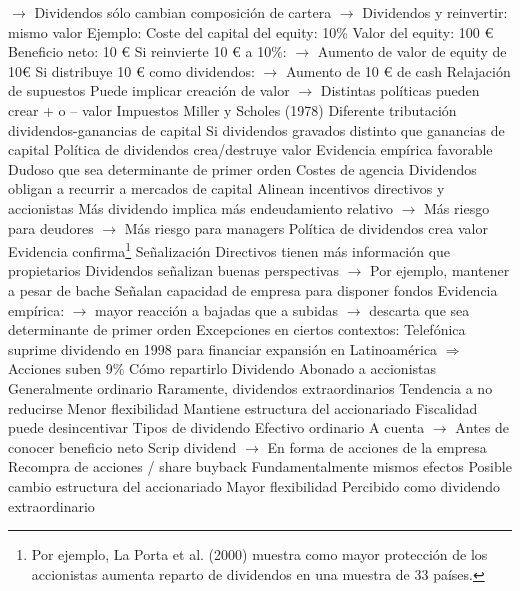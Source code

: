 \documentclass{nuevotema}
\begin{document}
\begin{esquemal}
				\4[] $\to$ Dividendos sólo cambian composición de cartera
				\4[] $\to$ Dividendos y reinvertir: mismo valor
				\4 Ejemplo:
				\4[] Coste del capital del equity: 10\%
				\4[] Valor del equity: 100 €
				\4[] Beneficio neto: 10 €
				\4[] Si reinvierte 10 € a 10\%:
				\4[] $\to$ Aumento de valor de equity de 10€
				\4[] Si distribuye 10 € como dividendos:
				\4[] $\to$ Aumento de 10 € de cash
				\4 Relajación de supuestos
				\4[] Puede implicar creación de valor
				\4[] $\to$ Distintas políticas pueden crear + o -- valor
			\3 Impuestos
				\4 Miller y Scholes (1978)
				\4 Diferente tributación dividendos-ganancias de capital
				\4[] Si dividendos gravados distinto que ganancias de capital
				\4[$\Rightarrow$] Política de dividendos crea/destruye valor
				\4 Evidencia empírica favorable
				\4 Dudoso que sea determinante de primer orden
			\3 Costes de agencia
				\4 Dividendos obligan a recurrir a mercados de capital
				\4 Alinean incentivos directivos y accionistas
				\4[] Más dividendo implica más endeudamiento relativo
				\4[] $\to$ Más riesgo para deudores
				\4[] $\to$ Más riesgo para managers
				\4[$\Rightarrow$] Política de dividendos crea valor
				\4 Evidencia confirma\footnote{Por ejemplo, La Porta et al. (2000) muestra como mayor protección de los accionistas aumenta reparto de dividendos en una muestra de 33 países.}
			\3 Señalización
				\4 Directivos tienen más información que propietarios
				\4[] Dividendos señalizan buenas perspectivas
				\4[] $\to$ Por ejemplo, mantener a pesar de bache
				\4[] Señalan capacidad de empresa para disponer fondos
				\4 Evidencia empírica:
				\4[] $\to$ mayor reacción a bajadas que a subidas
				\4[] $\to$ descarta que sea determinante de primer orden
				\4 Excepciones en ciertos contextos:
				\4[] Telefónica suprime dividendo en 1998
				\4[] para financiar expansión en Latinoamérica
				\4[] $\Rightarrow$ Acciones suben 9\%
		\2 Cómo repartirlo
			\3 Dividendo
				\4 Abonado a accionistas
				\4 Generalmente ordinario
				\4 Raramente, dividendos extraordinarios
				\4 Tendencia a no reducirse
				\4 Menor flexibilidad
				\4 Mantiene estructura del accionariado
				\4 Fiscalidad puede desincentivar
				\4 Tipos de dividendo
				\4[] Efectivo ordinario
				\4[] A cuenta
				\4[] $\to$ Antes de conocer beneficio neto
				\4[] Scrip dividend
				\4[] $\to$ En forma de acciones de la empresa
			\3 Recompra de acciones / share buyback
				\4 Fundamentalmente mismos efectos
				\4 Posible cambio estructura del accionariado
				\4 Mayor flexibilidad
				\4[] Percibido como dividendo extraordinario

\end{esquemal}
\end{document}
